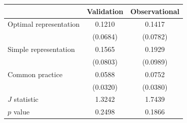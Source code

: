\begin{threeparttable}
\begin{tabular}{l | cc}
\toprule
 & Validation & Observational \\
\midrule
  Optimal representation &  0.1210  &  0.1417  \\
                         & (0.0684) & (0.0782) \\
  Simple representation  &  0.1565  &  0.1929  \\
                         & (0.0803) & (0.0989) \\
  Common practice        &  0.0588  &  0.0752  \\
                         & (0.0320) & (0.0380) \\
\midrule
  $J$ statistic & 1.3242 & 1.7439 \\
  $p$ value     & 0.2498 & 0.1866 \\
\bottomrule
\end{tabular}
\end{threeparttable}
